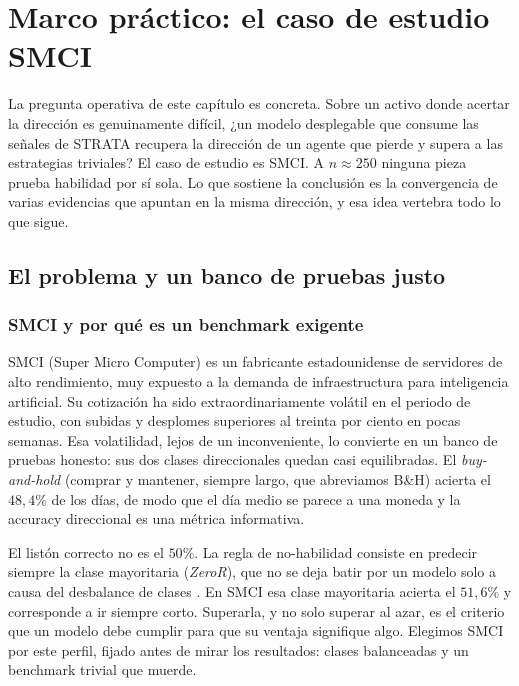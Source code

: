 \chapter{Marco práctico: el caso de estudio SMCI}
\label{cap:marco-practico}


La pregunta operativa de este capítulo es concreta. Sobre un activo donde acertar la dirección es genuinamente difícil, ¿un modelo desplegable que consume las señales de STRATA recupera la dirección de un agente que pierde y supera a las estrategias triviales? El caso de estudio es SMCI. A $n \approx 250$ ninguna pieza prueba habilidad por sí sola. Lo que sostiene la conclusión es la convergencia de varias evidencias que apuntan en la misma dirección, y esa idea vertebra todo lo que sigue.

\section{El problema y un banco de pruebas justo}
\label{sec:smci-banco}

\subsection{SMCI y por qué es un benchmark exigente}
\label{sec:smci-activo}

SMCI (Super Micro Computer) es un fabricante estadounidense de servidores de alto rendimiento, muy expuesto a la demanda de infraestructura para inteligencia artificial. Su cotización ha sido extraordinariamente volátil en el periodo de estudio, con subidas y desplomes superiores al treinta por ciento en pocas semanas. Esa volatilidad, lejos de un inconveniente, lo convierte en un banco de pruebas honesto: sus dos clases direccionales quedan casi equilibradas. El \emph{buy-and-hold} (comprar y mantener, siempre largo, que abreviamos B\&H) acierta el $48{,}4\%$ de los días, de modo que el día medio se parece a una moneda y la accuracy direccional es una métrica informativa.

El listón correcto no es el $50\%$. La regla de no-habilidad consiste en predecir siempre la clase mayoritaria (\emph{ZeroR}), que no se deja batir por un modelo solo a causa del desbalance de clases \cite{witten2016datamining, kuhn2008caret}. En SMCI esa clase mayoritaria acierta el $51{,}6\%$ y corresponde a ir siempre corto. Superarla, y no solo superar al azar, es el criterio que un modelo debe cumplir para que su ventaja signifique algo. Elegimos SMCI por este perfil, fijado antes de mirar los resultados: clases balanceadas y un benchmark trivial que muerde.

